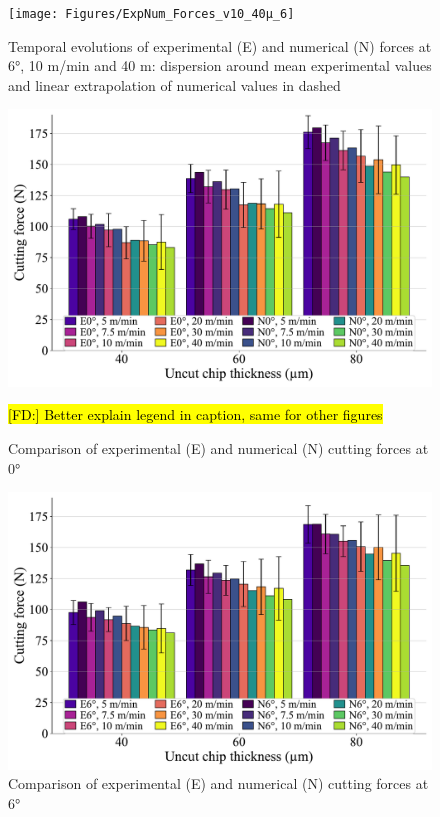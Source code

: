\documentclass[final,5p,times,twocolumn]{elsarticle}
\DeclareRobustCommand{\FD}[1]{ {\begingroup\sethlcolor{VWgreen}\textcolor{black}{\hl{[FD:] #1}}\endgroup} }
\begin{document}
\begin{figure}[h]
\centering
\texttt{[image: Figures/ExpNum\_Forces\_v10\_40µ\_6]}
\caption{Temporal evolutions of experimental (E) and numerical (N) forces at 6°, 10 m/min and 40 \textmu{}m: dispersion around mean experimental values and linear extrapolation of numerical values in dashed}
\label{ExpNum_Forces_v10_40µ_6}
\end{figure}

\begin{figure}[h]
\centering
\includegraphics[width=\columnwidth]{Figures/Fx_0}
\caption{Comparison of experimental (E) and numerical (N) cutting forces at 0°}\FD{Better explain legend in caption, same for other figures}
\label{Fx_0}
\end{figure}

\begin{figure}[h]
\centering
\includegraphics[width=\columnwidth]{Figures/Fx_6}
\caption{Comparison of experimental (E) and numerical (N) cutting forces at 6°}
\label{Fx_6}
\end{figure}
\end{document}
